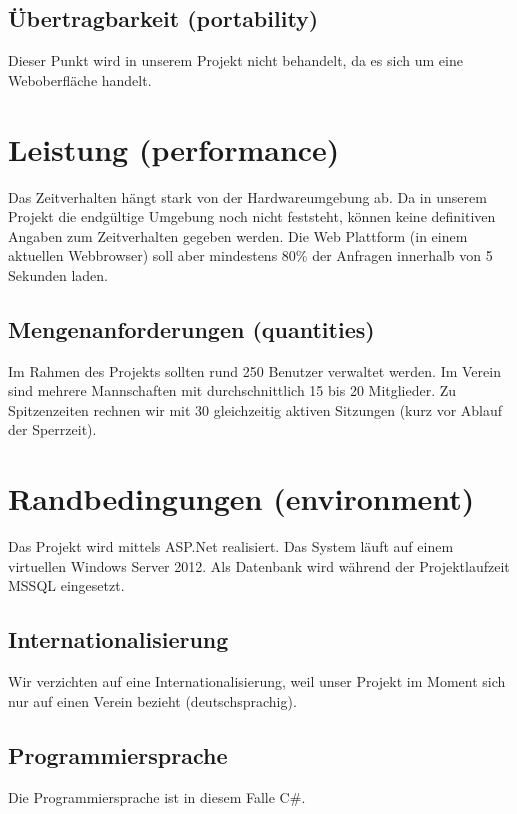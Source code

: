 	\subsection {Übertragbarkeit (portability)}
	Dieser Punkt wird in unserem Projekt nicht behandelt, da es sich um eine Weboberfläche handelt.
	
	\section{Leistung (performance)}
	Das Zeitverhalten hängt stark von der Hardwareumgebung ab. Da in unserem Projekt die endgültige Umgebung noch nicht feststeht, können keine definitiven Angaben zum Zeitverhalten gegeben werden. Die Web Plattform (in einem aktuellen Webbrowser) soll aber mindestens 80\% der Anfragen innerhalb von 5 Sekunden laden. 
	
	\subsection{Mengenanforderungen (quantities)}
	Im Rahmen des Projekts sollten rund 250 Benutzer verwaltet werden. Im Verein sind mehrere Mannschaften mit durchschnittlich 15 bis 20 Mitglieder. 
	Zu Spitzenzeiten rechnen wir mit 30 gleichzeitig aktiven Sitzungen (kurz vor Ablauf der Sperrzeit).  
		
	\section{Randbedingungen (environment)}
	Das Projekt wird mittels ASP.Net realisiert. Das System läuft auf einem virtuellen Windows Server 2012. 
	Als Datenbank wird während der Projektlaufzeit MSSQL eingesetzt.
	
	\subsection{Internationalisierung}
	Wir verzichten auf eine Internationalisierung, weil unser Projekt im Moment sich nur auf einen Verein bezieht (deutschsprachig).
	
	\subsection{Programmiersprache}
	Die Programmiersprache ist in diesem Falle C\#.

	

